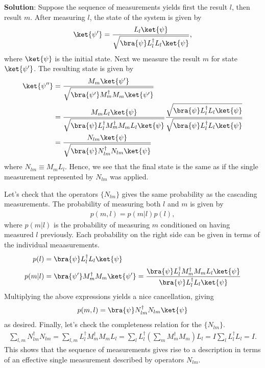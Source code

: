 \documentclass{book}
\begin{document}
	\textbf{Solution}: Suppose the sequence of measurements yields first the result $l$, then result $m$. After measuring $l$, the state of the system is given by 
	\begin{align}
		\ket{\psi'} = \frac{L_l \ket{\psi}}{\sqrt{\bra{\psi}L_l^\dagger L_l \ket{\psi}}},
	\end{align}
	where $\ket{\psi}$ is the initial state. Next we measure the result $m$ for state $\ket{\psi'}$. The resulting state is given by 
	\begin{align}
	\begin{aligned}
		\ket{\psi''} &= \frac{M_m \ket{\psi'}}{\sqrt{\bra{\psi'}M_m^\dagger M_m \ket{\psi'}}} \\
		&= \frac{M_m L_l \ket{\psi}}{\sqrt{\bra{\psi}L_l^\dagger M_m^\dagger M_m L_l\ket{\psi}}} \frac{\sqrt{\bra{\psi} L_l^\dagger L_l \ket{\psi}}}{\sqrt{\bra{\psi} L_l^\dagger L_l \ket{\psi}}} \\
		&= \frac{N_{lm}\ket{\psi}}{\sqrt{\bra{\psi}N_{lm}^\dagger N_{lm}\ket{\psi}}}
	\end{aligned}
	\end{align}
	where $N_{lm} \equiv M_m L_l$. Hence, we see that the final state is the same as if the single measurement represented by $N_{lm}$ was applied. 
	
	Let's check that the operators $\{N_{lm}\}$ gives the same probability as the cascading measurements. The probability of measuring both $l$ and $m$ is given by 
	\begin{align}
		p(m,l) = p(m|l) p(l),
	\end{align}
	where $p(m|l)$ is the probability of measuring $m$ conditioned on having measured $l$ previously. Each probability on the right side can be given in terms of the individual meaasurements.
	\begin{align}
	\begin{aligned}
		p(l) &= \bra{\psi}L_l^\dagger L_l \ket{\psi} \\
		p(m|l) &=\bra{\psi'} M_m^\dagger M_m \ket{\psi'} = \frac{\bra{\psi} L_l^\dagger M_m^\dagger M_m L_l \ket{\psi}}{\bra{\psi}L_l^\dagger L_l \ket{\psi}}
	\end{aligned}
	\end{align}
	Multiplying the above expressions yields a nice cancellation, giving
	\begin{align}
		p(m,l) = \bra{\psi} N_{lm}^\dagger N_{lm} \ket{\psi}
	\end{align}
	as desired. Finally, let's check the completeness relation for the $\{N_{lm}\}$.
	\begin{align}
		\sum_{l,m} N_{lm}^\dagger N_{lm} = \sum_{l,m}L_l^\dagger M_m^\dagger M_m L_l =  \sum_l L_l^\dagger (\sum_m M_m^\dagger M_m) L_l = I \sum_l L_l^\dagger L_l = I.
	\end{align}
	This shows that the sequence of measurements gives rise to a description in terms of an effective single measurement described by operators $N_{lm}$. 
\end{document}
